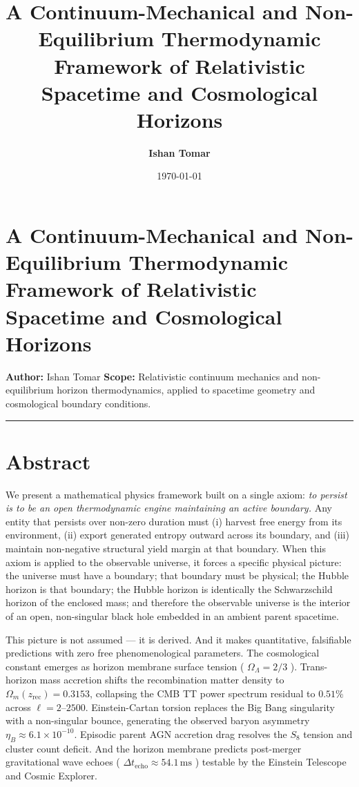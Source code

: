 \documentclass[11pt,a4paper]{article}
\title{\textbf{A Continuum-Mechanical and Non-Equilibrium Thermodynamic Framework of Relativistic Spacetime and Cosmological Horizons}}\author{\textbf{Ishan Tomar}}\date{\today}
\theoremstyle{definition}\newtheorem{definition}{Definition}
\theoremstyle{remark}\newtheorem{remark}{Remark}
\begin{document}
\maketitle\tableofcontents\newpage


\section*{A Continuum-Mechanical and Non-Equilibrium Thermodynamic Framework of Relativistic Spacetime and Cosmological Horizons}

\textbf{Author:} Ishan Tomar  
\textbf{Scope:} Relativistic continuum mechanics and non-equilibrium horizon thermodynamics, applied to spacetime geometry and cosmological boundary conditions.

\noindent\rule{\linewidth}{0.4pt}
\section{Abstract}

We present a mathematical physics framework built on a single axiom: \textit{to persist is to be an open thermodynamic engine maintaining an active boundary.} Any entity that persists over non-zero duration must (i) harvest free energy from its environment, (ii) export generated entropy outward across its boundary, and (iii) maintain non-negative structural yield margin at that boundary. When this axiom is applied to the observable universe, it forces a specific physical picture: the universe must have a boundary; that boundary must be physical; the Hubble horizon is that boundary; the Hubble horizon is identically the Schwarzschild horizon of the enclosed mass; and therefore the observable universe is the interior of an open, non-singular black hole embedded in an ambient parent spacetime.

This picture is not assumed — it is derived. And it makes quantitative, falsifiable predictions with zero free phenomenological parameters. The cosmological constant emerges as horizon membrane surface tension ( $\Omega_\Lambda = 2/3$ ). Trans-horizon mass accretion shifts the recombination matter density to $\Omega_m(z_{\text{rec}}) = 0.3153$, collapsing the CMB TT power spectrum residual to $0.51\%$ across $\ell = 2\text{--}2500$. Einstein-Cartan torsion replaces the Big Bang singularity with a non-singular bounce, generating the observed baryon asymmetry $\eta_B \approx 6.1 \times 10^{-10}$. Episodic parent AGN accretion drag resolves the $S_8$ tension and cluster count deficit. And the horizon membrane predicts post-merger gravitational wave echoes ( $\Delta t_{\text{echo}} \approx 54.1\,\text{ms}$ ) testable by the Einstein Telescope and Cosmic Explorer.
\end{document}
